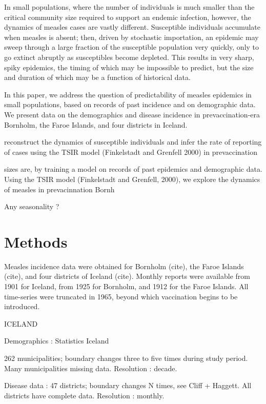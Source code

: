 \documentclass[10pt]{article}
\begin{document}
In small populations, where the number of individuals is much smaller than the critical community size required to support an endemic infection, however, the dynamics of measles cases are vastly different. Susceptible individuals accumulate when measles is absent; then, driven by stochastic importation, an epidemic may sweep through a large fraction of the susceptible population very quickly, only to go extinct abruptly as susceptibles become depleted. This results in very sharp, spiky epidemics, the timing of which may be impossible to predict, but the size and duration of which may be a function of historical data. 

In this paper, we address the question of predictability of measles epidemics in small populations, based on records of past incidence and on demographic data. We present data on the demographics and disease incidence in prevaccination-era Bornholm, the Faroe Islands, and four districts in Iceland. 

reconstruct the dynamics of susceptible individuals and infer the rate of reporting of cases using the TSIR model (Finkelstadt and Grenfell 2000) in prevaccination 
 
	

sizes are, by training a model on records of past epidemics and demographic data. Using the TSIR model (Finkelstadt and Grenfell, 2000), we explore the dynamics of measles in prevacinnation Bornh


Any seasonality ? 






\section*{Methods}

Measles incidence data were obtained for Bornholm (cite), the Faroe Islands (cite), and four districts of Iceland (cite). Monthly reports were available from 1901 for Iceland, from 1925 for Bornholm, and 1912 for the Faroe Islands. All time-series were truncated in 1965, beyond which vaccination begins to be introduced. 


ICELAND

Demographics : Statistics Iceland 

262 municipalities; boundary changes three to five times during study period. Many municipalities missing data. Resolution : decade.

Disease data : 47 districts; boundary changes N times, see Cliff + Haggett. All districts have complete data. Resolution : monthly.
\end{document}
